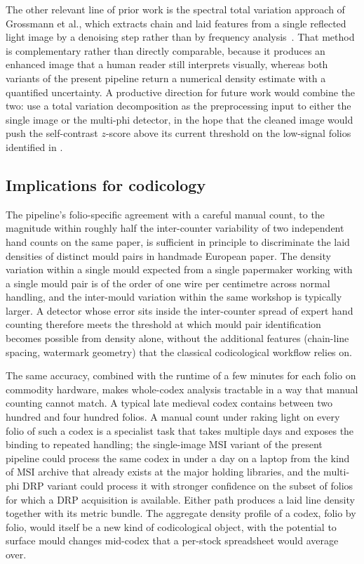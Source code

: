 The other relevant line of prior work is the spectral total
variation approach of Grossmann et al., which extracts chain and
laid features from a single reflected light image by a denoising
step rather than by frequency analysis~\cite{grossmann2023chain}. That
method is complementary rather than directly comparable, because
it produces an enhanced image that a human reader still interprets
visually, whereas both variants of the present pipeline return a
numerical density estimate with a quantified uncertainty. A
productive direction for future work would combine the two: use a
total variation decomposition as the preprocessing input to either
the single image or the multi-phi detector, in the hope that the
cleaned image would push the self-contrast $z$-score above its
current threshold on the low-signal folios identified in
.

\subsection{Implications for codicology}
\label{sec:discussion:codicology}

The pipeline's folio-specific agreement with a careful manual count,
to the magnitude within roughly half the inter-counter variability of two
independent hand counts on the same paper, is sufficient in
principle to discriminate the laid densities of distinct mould
pairs in handmade European paper. The density
variation within a single mould expected from a single papermaker working with a single
mould pair is of the order of one wire per centimetre across
normal handling, and the inter-mould variation within the same
workshop is typically larger. A detector whose error
sits inside the inter-counter spread of expert hand counting
therefore meets the threshold at which mould pair identification
becomes possible from density alone, without the additional
features (chain-line spacing, watermark geometry) that the
classical codicological workflow relies on.

The same accuracy, combined with the runtime of a few
minutes for each folio on commodity hardware, makes whole-codex analysis tractable
in a way that manual counting cannot match. A typical late
medieval codex contains between two hundred and four hundred
folios. A manual count under raking light on every folio of such a
codex is a specialist task that takes multiple days and exposes the binding to
repeated handling; the single-image MSI variant of the present
pipeline could process the same codex in under a day on a laptop
from the kind of MSI archive that already exists at the major
holding libraries, and the multi-phi DRP variant could process it
with stronger confidence on the subset of folios for which a DRP
acquisition is available. Either path produces a laid line
density together with its metric bundle. The aggregate density profile of a codex,
folio by folio, would itself be a new kind of codicological
object, with the potential to surface mould changes mid-codex that
a per-stock spreadsheet would average over.

